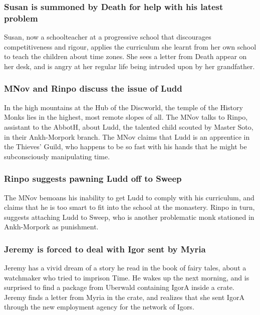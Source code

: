 \subsubsection{\Gls{Susan} is summoned by \Gls{Death} for help with his latest problem}
\Gls{Susan}, now a schoolteacher at a progressive school that discourages competitiveness and
rigour, applies the curriculum she learnt from her own school to teach the children about time
zones. She sees a letter from \Gls{Death} appear on her desk, and is angry at her regular life
being intruded upon by her grandfather.

\subsubsection{\Gls{MNov} and \Gls{Rinpo} discuss the issue of \Gls{Ludd}}
In the high mountains at the Hub of the Discworld, the temple of the History Monks lies in the
highest, most remote slopes of all. The \Gls{MNov} talks to \Gls{Rinpo}, assistant to the
\Gls{AbbotH}, about \Gls{Ludd}, the talented child scouted by Master \Gls{Soto}, in their
Ankh-Morpork branch. The \Gls{MNov} claims that \Gls{Ludd} is an apprentice in the Thieves' Guild,
who happens to be so fast with his hands that he might be subconsciously manipulating time.

\subsubsection{\Gls{Rinpo} suggests pawning \Gls{Ludd} off to \Gls{Sweep}}
The \Gls{MNov} bemoans his inability to get \Gls{Ludd} to comply with his curriculum, and claims
that he is too smart to fit into the school at the monastery. \Gls{Rinpo} in turn, suggests
attaching \Gls{Ludd} to \Gls{Sweep}, who is another problematic monk stationed in Ankh-Morpork as
punishment.

\subsubsection{\Gls{Jeremy} is forced to deal with \Gls{Igor} sent by \Gls{Myria}}
\Gls{Jeremy} has a vivid dream of a story he read in the book of fairy tales, about a watchmaker
who tried to imprison \Gls{Time}. He wakes up the next morning, and is surprised to find a package from
Uberwald containing \Gls{IgorA} inside a crate. \Gls{Jeremy} finds a letter from \Gls{Myria} in the
crate, and realizes that she sent \Gls{IgorA} through the new employment agency for the network of
Igors.

